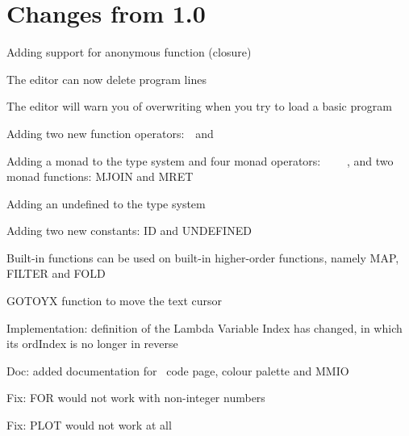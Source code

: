 \chapter{Changes from 1.0}

\begin{itemlist}
\item Adding support for anonymous function (closure)
\item The editor can now delete program lines
\item The editor will warn you of overwriting when you try to load a basic program
\item Adding two new function operators: \basicapply\ \,and\ \,\basiccompo
\item Adding a monad to the type system and four monad operators: \basicmbind\ \basicmseq\ \basicmjoin\ \basicmret\ , and two monad functions: MJOIN and MRET
\item Adding an undefined to the type system
\item Adding two new constants: ID and UNDEFINED
\item Built-in functions can be used on built-in higher-order functions, namely MAP, FILTER and FOLD
\item GOTOYX function to move the text cursor
\item Implementation: definition of the Lambda Variable Index has changed, in which its ordIndex is no longer in reverse
\item Doc: added documentation for \thismachine\ code page, colour palette and MMIO
\item Fix: FOR would not work with non-integer numbers
\item Fix: PLOT would not work at all
\end{itemlist}
